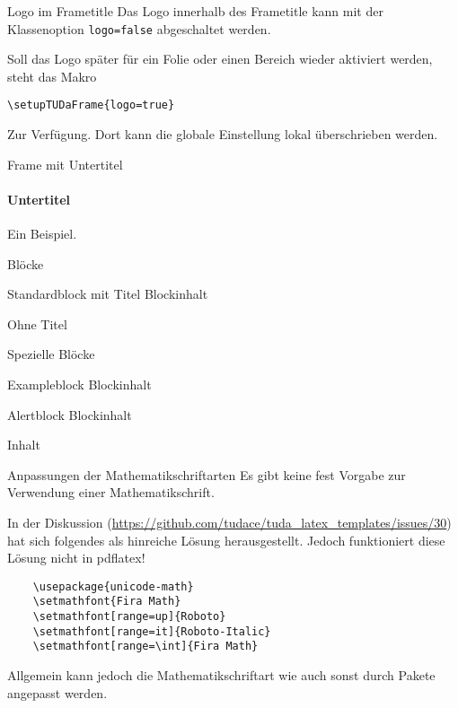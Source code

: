 \documentclass[
	ngerman,%
	aspectratio=169,%
	color={accentcolor=2d},
	logo=false,%
	colorframetitle=true,%
	]{tudabeamer}
\let\code\texttt
\begin{document}
\begin{frame}[fragile]{Logo im Frametitle}
Das Logo innerhalb des Frametitle kann mit der Klassenoption \code{logo=false} abgeschaltet werden.

Soll das Logo später für ein Folie oder einen Bereich wieder aktiviert werden, steht das Makro
\begin{verbatim}
\setupTUDaFrame{logo=true}
\end{verbatim}
Zur Verfügung. Dort kann die globale Einstellung lokal überschrieben werden.
\end{frame}

\begin{frame}{Frame mit Untertitel}
\framesubtitle{Untertitel}
Ein Beispiel.
\end{frame}

\begin{frame}{Blöcke}
\begin{block}{Standardblock mit Titel}
	Blockinhalt
\end{block}
\begin{block}{}
	Ohne Titel
\end{block}
\end{frame}

\begin{frame}{Spezielle Blöcke}
\begin{exampleblock}{Exampleblock}
	Blockinhalt
\end{exampleblock}
\begin{alertblock}{Alertblock}
	Blockinhalt
\end{alertblock}
\begin{example}
	Inhalt
\end{example}
\end{frame}


\begin{frame}[fragile]{Anpassungen der Mathematikschriftarten}
	Es gibt keine fest Vorgabe zur Verwendung einer Mathematikschrift.
	
	In der Diskussion (\url{https://github.com/tudace/tuda_latex_templates/issues/30}) hat sich folgendes als hinreiche Lösung herausgestellt. Jedoch funktioniert diese Lösung nicht in pdflatex!
	\begin{verbatim}
	\usepackage{unicode-math}
	\setmathfont{Fira Math}
	\setmathfont[range=up]{Roboto}
	\setmathfont[range=it]{Roboto-Italic}
	\setmathfont[range=\int]{Fira Math}
	\end{verbatim}
	Allgemein kann jedoch die Mathematikschriftart wie	auch sonst durch Pakete angepasst werden.
\end{frame}
\end{document}
